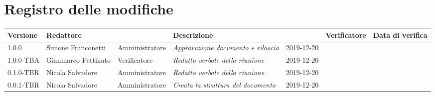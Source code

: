 \section*{Registro delle modifiche}
\renewcommand{\arraystretch}{1.8}

  \begin{longtable}{|p{1.5cm}|p{1.7cm}|p{2cm}|p{2cm}|p{1.7cm}|p{2cm}|p{2.7cm}|}
    \hline
    \rowcolor{header}
    \textbf{Versione} & \textbf{Redattore} & \centering{\textbf{Ruolo}} & \textbf{Descrizione} &      \centering{\textbf{Data}} & \textbf{Verificatore} & \textbf{Data di verifica} \\
    \hline
    1.0.0 & Simone Franconetti & Amministratore & \small{\textit{Approvazione documento e rilascio}} & 2019-12-20 & & \\
	1.0.0-TBA & Gianmarco Pettinato & Verificatore & \small{\textit{Redatto verbale della riunione}} & 2019-12-20 & & \\
    0.1.0-TBR & Nicola Salvadore & Amministratore & \small{\textit{Redatto verbale della riunione}} & 2019-12-20 & & \\
    0.0.1-TBR & Nicola Salvadore & Amministratore & \small{\textit{Creata la struttura del documento}} & 2019-12-20 & & \\

    \hline
  \end{longtable}

